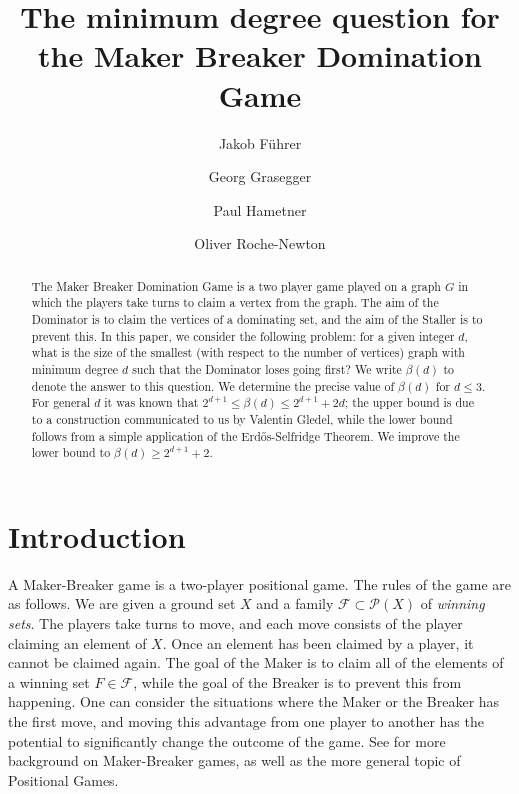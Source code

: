 \documentclass[a4paper,11pt,oneside]{scrartcl}
\title{The minimum degree question for the Maker Breaker Domination Game}
\date{}
\author[1]{Jakob Führer}
\author[2]{Georg Grasegger}
\author[3]{Paul Hametner}
\author[1]{Oliver Roche-Newton}
\affil[1]{Johannes Kepler University Linz, Institute for Algebra}
\affil[2]{Johann Radon Institute for Computational and Applied Mathematics, Austrian Academy of Sciences}
\affil[3]{Institute of Science and Technology, Austria}
\theoremstyle{definition}
\theoremstyle{remark}
\begin{document}
\maketitle
\begin{abstract}
    The Maker Breaker Domination Game is a two player game played on a graph $G$ in which the players take turns to claim a vertex from the graph. The aim of the Dominator is to claim the vertices of a dominating set, and the aim of the Staller is to prevent this. In this paper, we consider the following problem: for a given integer $d$, what is the size of the smallest (with respect to the number of vertices) graph with minimum degree $d$ such that the Dominator loses going first? We write $\beta(d)$ to denote the answer to this question. We determine the precise value of $\beta(d)$ for $d\leq 3$. For general $d$ it was known that $2^{d+1} \leq \beta(d) \leq 2^{d+1}+2d$; the upper bound is due to a construction communicated to us by Valentin Gledel, while the lower bound follows from a simple application of the Erd\H{o}s-Selfridge Theorem. We improve the lower bound to $\beta(d) \geq 2^{d+1}+2$.
\end{abstract}


\section{Introduction}\label{sec:introduction}

A Maker-Breaker game is a two-player positional game. The rules of the game are as follows. We are given a ground set $X$ and a family $\mathcal F \subset \mathcal P(X)$ of \textit{winning sets}. The players take turns to move, and each move consists of the player claiming an element of $X$. Once an element has been claimed by a player, it cannot be claimed again. The goal of the Maker is to claim all of the elements of a winning set $F \in \mathcal F$, while the goal of the Breaker is to prevent this from happening. One can consider the situations where the Maker or the Breaker has the first move, and moving this advantage from one player to another has the potential to significantly change the outcome of the game. See \cite{HKSS} for more background on Maker-Breaker games, as well as the more general topic of Positional Games.
\end{document}
